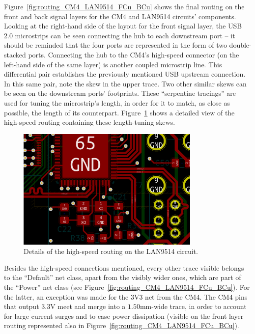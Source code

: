 Figure~\ref{fig:routing_CM4_LAN9514_FCu_BCu} shows the final routing on the front and back signal layers for the CM4 and LAN9514 circuits' components. Looking at the right-hand side of the layout for the front signal layer, the USB 2.0 microstrips can be seen connecting the hub to each downstream port -- it should be reminded that the four ports are represented in the form of two double-stacked ports. Connecting the hub to the CM4's high-speed connector (on the left-hand side of the same layer) is another coupled microstrip line. This differential pair establishes the previously mentioned USB upstream connection. In this same pair, note the skew in the upper trace. Two other similar skews can be seen on the downstream ports' footprints. These ``serpentine tracings'' are used for tuning the microstrip's length, in order for it to match, as close as possible, the length of its counterpart. Figure~\ref{fig:USB_zoom} shows a detailed view of the high-speed routing containing these length-tuning skews.

\begin{figure}[h]
	\centering
	\includegraphics[width=0.8\textwidth]{Chapters/Figures/chapter5/USB_zoom.png}
	\caption{Details of the high-speed routing on the LAN9514 circuit.}
	\label{fig:USB_zoom}
\end{figure}


Besides the high-speed connections mentioned, every other trace visible belongs to the ``Default'' net class, apart from the visibly wider ones, which are part of the ``Power'' net class (see Figure~\ref{fig:routing_CM4_LAN9514_FCu_BCu}). For the latter, an exception was made for the 3V3 net from the CM4. The CM4 pins that output 3.3V meet and merge into a $1.50$mm-wide trace, in order to account for large current surges and to ease power dissipation (visible on the front layer routing represented also in Figure~\ref{fig:routing_CM4_LAN9514_FCu_BCu}).


